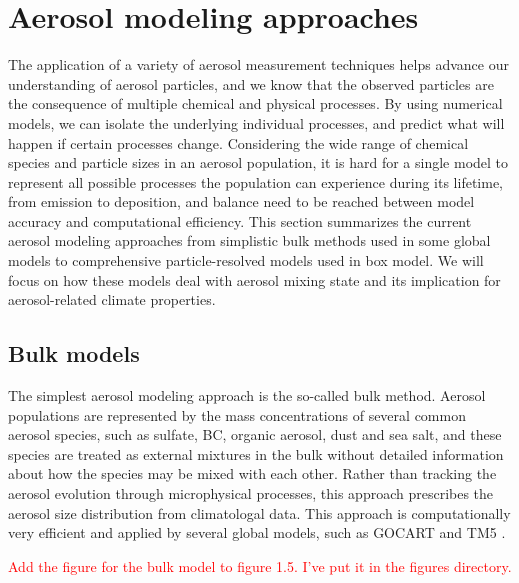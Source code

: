 \documentclass[edeposit,fullpage]{uiucthesis2009}
\begin{document}
\section{Aerosol modeling approaches}
The application of a variety of aerosol measurement techniques helps
advance our understanding of aerosol particles, and we know that the
observed particles are the consequence of multiple chemical and
physical processes. By using numerical models, we can isolate the
underlying individual processes, and predict what will happen if
certain processes change. Considering the wide range of chemical
species and particle sizes in an aerosol population, it is hard for a
single model to represent all possible processes the population can
experience during its lifetime, from emission to deposition, and
balance need to be reached between model accuracy and computational
efficiency. This section summarizes the current aerosol modeling
approaches from simplistic bulk methods used in some global models to
comprehensive particle-resolved models used in box model. We will
focus on how these models deal with aerosol mixing state and its
implication for aerosol-related climate properties.

\subsection{Bulk models}
The simplest aerosol modeling approach is the so-called bulk
method. Aerosol populations are represented by the mass concentrations
of several common aerosol species, such as sulfate, BC, organic
aerosol, dust and sea salt, and these species are treated as external
mixtures in the bulk without detailed information about how the
species may be mixed with each other. Rather than tracking the aerosol
evolution through microphysical processes, this approach prescribes
the aerosol size distribution from climatologal data. This approach is
computationally very efficient and applied by several global models,
such as GOCART \citep{chin2000atmospheric} and TM5
\citep{vignati2010sources}.

\textcolor{red}{Add the figure for the bulk model to figure 1.5. I've
  put it in the figures directory.}
\end{document}
